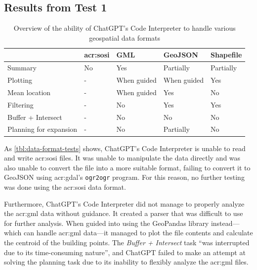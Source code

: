 \subsection{Results from Test 1}\label{subsec:experiment-1-results}

\begin{table}
    \centering
    \begin{tabular}{l|p{}p{}p{}p{}}
        \toprule
                               & \textbf{\acrshort{acr:sosi}} & \textbf{GML} & \textbf{GeoJSON} & \textbf{Shapefile} \\
        \midrule
        Summary                & No                           & Yes          & Partially        & Partially          \\
        Plotting               & -                            & When guided  & When guided      & Yes                \\
        Mean location          & -                            & When guided  & Yes              & No                 \\
        Filtering              & -                            & No           & Yes              & Yes                \\
        Buffer + Intersect     & -                            & No           & No               & No                 \\
        Planning for expansion & -                            & No           & Partially        & No                 \\
        \bottomrule
    \end{tabular}
    \caption{Overview of the ability of ChatGPT's Code Interpreter to handle various geospatial data formats}
    \label{tbl:data-format-tests}
\end{table}

As \autoref{tbl:data-format-tests} shows, ChatGPT's Code Interpreter is unable to read and write \acrshort{acr:sosi} files. It was unable to manipulate the data directly and was also unable to convert the file into a more suitable format, failing to convert it to GeoJSON using \acrshort{acr:gdal}'s \texttt{ogr2ogr} program. For this reason, no further testing was done using the \acrshort{acr:sosi} data format.

Furthermore, ChatGPT's Code Interpreter did not manage to properly analyze the \acrshort{acr:gml} data without guidance. It created a parser that was difficult to use for further analysis. When guided into using the GeoPandas library instead---which can handle \acrshort{acr:gml} data---it managed to plot the file contents and calculate the centroid of the building points. The \textit{Buffer + Intersect} task \enquote{was interrupted due to its time-consuming nature}, and ChatGPT failed to make an attempt at solving the planning task due to its inability to flexibly analyze the \acrshort{acr:gml} files.

